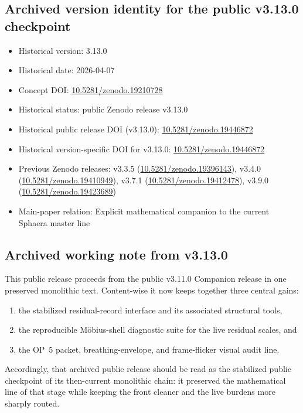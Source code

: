 \subsection*{Archived version identity for the public v3.13.0 checkpoint}
\begin{itemize}[leftmargin=2em]
  \item Historical version: 3.13.0
  \item Historical date: 2026-04-07
  \item Concept DOI: \href{https://doi.org/10.5281/zenodo.19210728}{10.5281/zenodo.19210728}
  \item Historical status: public Zenodo release v3.13.0
  \item Historical public release DOI (v3.13.0): \href{https://doi.org/10.5281/zenodo.19446872}{10.5281/zenodo.19446872}
  \item Historical version-specific DOI for v3.13.0: \href{https://doi.org/10.5281/zenodo.19446872}{10.5281/zenodo.19446872}
  \item Previous Zenodo releases: v3.3.5 (\href{https://doi.org/10.5281/zenodo.19396143}{10.5281/zenodo.19396143}), v3.4.0 (\href{https://doi.org/10.5281/zenodo.19410949}{10.5281/zenodo.19410949}), v3.7.1 (\href{https://doi.org/10.5281/zenodo.19412478}{10.5281/zenodo.19412478}), v3.9.0 (\href{https://doi.org/10.5281/zenodo.19423689}{10.5281/zenodo.19423689})
  \item Main-paper relation: Explicit mathematical companion to the current Sphaera master line~\cite{brendecke2026main}
\end{itemize}

\subsection*{Archived working note from v3.13.0}
This public release proceeds from the public v3.11.0 Companion release in one preserved monolithic text. Content-wise it now keeps together three central gains:
\begin{enumerate}[leftmargin=2em,label=(\roman*)]
  \item the stabilized residual-record interface and its associated structural tools,
  \item the reproducible M\"obius-shell diagnostic suite for the live residual scales, and
  \item the OP~5 packet, breathing-envelope, and frame-flicker visual audit line.
\end{enumerate}
Accordingly, that archived public release should be read as the stabilized public checkpoint of its then-current monolithic chain: it preserved the mathematical line of that stage while keeping the front cleaner and the live burdens more sharply routed.

